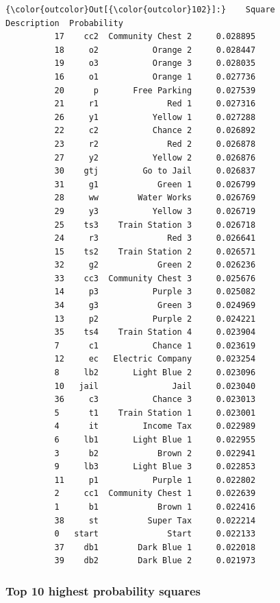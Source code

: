 \documentclass[11pt]{article}
\begin{document}
\begin{Verbatim}[commandchars=\\\{\}]
{\color{outcolor}Out[{\color{outcolor}102}]:}    Square        Description  Probability
          17    cc2  Community Chest 2     0.028895
          18     o2           Orange 2     0.028447
          19     o3           Orange 3     0.028035
          16     o1           Orange 1     0.027736
          20      p       Free Parking     0.027539
          21     r1              Red 1     0.027316
          26     y1           Yellow 1     0.027288
          22     c2           Chance 2     0.026892
          23     r2              Red 2     0.026878
          27     y2           Yellow 2     0.026876
          30    gtj         Go to Jail     0.026837
          31     g1            Green 1     0.026799
          28     ww        Water Works     0.026769
          29     y3           Yellow 3     0.026719
          25    ts3    Train Station 3     0.026718
          24     r3              Red 3     0.026641
          15    ts2    Train Station 2     0.026571
          32     g2            Green 2     0.026236
          33    cc3  Community Chest 3     0.025676
          14     p3           Purple 3     0.025082
          34     g3            Green 3     0.024969
          13     p2           Purple 2     0.024221
          35    ts4    Train Station 4     0.023904
          7      c1           Chance 1     0.023619
          12     ec   Electric Company     0.023254
          8     lb2       Light Blue 2     0.023096
          10   jail               Jail     0.023040
          36     c3           Chance 3     0.023013
          5      t1    Train Station 1     0.023001
          4      it         Income Tax     0.022989
          6     lb1       Light Blue 1     0.022955
          3      b2            Brown 2     0.022941
          9     lb3       Light Blue 3     0.022853
          11     p1           Purple 1     0.022802
          2     cc1  Community Chest 1     0.022639
          1      b1            Brown 1     0.022416
          38     st          Super Tax     0.022214
          0   start              Start     0.022133
          37    db1        Dark Blue 1     0.022018
          39    db2        Dark Blue 2     0.021973
\end{Verbatim}
            
    \hypertarget{top-10-highest-probability-squares}{%
\subsubsection{Top 10 highest probability
squares}\label{top-10-highest-probability-squares}}
\end{document}
